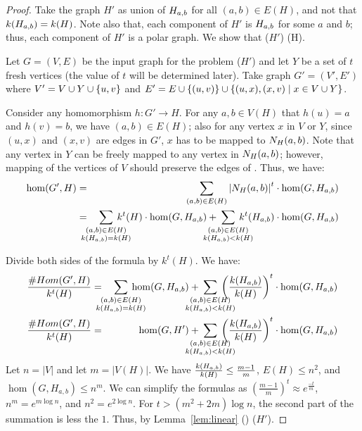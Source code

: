 \begin{proof}
Take the graph \(H'\) as union of \(H_{a,b}\) for all \((a,b)\in E(H)\), and
not that \(k(H_{a,b})=k(H)\)\@. Note also that, each component of \(H'\) is \(H_{a,b}\) for 
some \(a\) and \(b\); thus, each component of \(H'\) is a polar graph.
We show that \chom(\(H'\)) \maple \chom(H)\@.

Let \(G=(V,E)\) be the input graph for the problem \chom(\(H'\)) 
and let \(Y\) be a set of \(t\) fresh vertices
(the value of \(t\) will be determined later). Take graph \(G'=(V',E')\) where
\(V'=V \cup Y \cup \{{u,v}\}\) and \(E'=E \cup \{{(u,v)}\} \cup
\{{(u,x),(x,v) \mid x\in V \cup Y}\}\)\@.

Consider any homomorphism \(h: G'\to H\)\@.
For any \(a,b\in V(H)\) that \(h(u)=a\) and \(h(v)=b\), we have \((a,b)\in E(H)\); also
for any vertex \(x\) in \(V\) or \(Y\), since \((u,x)\) and \((x,v)\) are edges in \(G'\), 
\(x\) has to be mapped to \(N_{H}({a},{b})\)\@. Note that any vertex in \(Y\) can be freely mapped
to any vertex in \(N_{H}({a},{b})\); however, mapping of the vertices of \(V\) should preserve the edges 
of \mG\@. Thus, we have:
\begin{eqnarray*}
\hom(G',H) &=&  
\sum_{(a,b)\in E(H)}\left|\NHab Hab\right|^ t \cdot
\hom(G,\Hab)\\
&=& 
\bigsum{\substack{(a,b)\in E(H) \\
\magf(H_{a,b})=\magf(H)}} 
\magf^t(H) \cdot \hom(G,H_{a,b})+
\bigsum{\substack{(a,b)\in E(H) \\ \magf(H_{a,b}) < \magf(H)}}k^t
(H_{a,b})\cdot \hom(G,H_{a,b})
\end{eqnarray*}

Divide both sides of the formula by \(k^t(H)\)\@. We have:
\begin{eqnarray*}
\frac{\chom(G',H)}{\magf^t(H)} &=& 
\bigsum{\substack{(a,b)\in E(H) \\ \magf(H_{a,b})=\magf(H)}} 
\hom(G,H_{a,b}) + 
\bigsum{\substack{(a,b)\in E(H) \\ \magf(H_{a,b})<\magf(H)}}
\left(\frac{\magf(H_{a,b})}{\magf(H)} \right )^t
\cdot\hom(G,H_{a,b})\\
\frac{\chom(G',H)}{\magf^t(H)} &=& 
\hom(G,H') + \bigsum{\substack{(a,b)\in E(H) \\ \magf(H_{a,b})<\magf(H)}}
\left(\frac{\magf(H_{a,b})}{\magf(H)} \right )^t
\cdot\hom(G,H_{a,b})\\
\end{eqnarray*}
Let \(n=|V|\) and let \(m=|V(H)|\). We have \(\frac{k(H_{a,b})}{k(H)} \le \frac{m-1}{m}\),
\(E(H)\le n^2\), and \(\hom(G,H_{a,b}) \le n^m\).
We can simplify the formulas as \((\frac{m-1}{m})^t \approx e^{\frac{-t}{m}}\),
\(n^m = e^{m\log n}\), and \(n^2 = e^{2\log n}\).
For \(t > (m^2+2m) \log n\), the second part of the summation is less the \(1\).
Thus, by Lemma~\ref{lem:linear} \chom(\mH) \mapge \chom(\(H'\)).
\end{proof}

